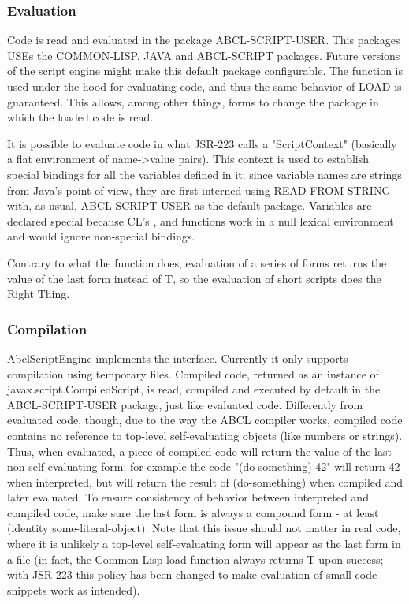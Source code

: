 \documentclass[10pt]{book}
\begin{document}
\subsubsection{Evaluation}

Code is read and evaluated in the package ABCL-SCRIPT-USER. This
packages USEs the COMMON-LISP, JAVA and ABCL-SCRIPT packages. Future
versions of the script engine might make this default package
configurable. The  function is used under the hood for
evaluating code, and thus the same behavior of LOAD is
guaranteed. This allows, among other things,  forms
to change the package in which the loaded code is read.

It is possible to evaluate code in what JSR-223 calls a
"ScriptContext" (basically a flat environment of name->value
pairs). This context is used to establish special bindings for all the
variables defined in it; since variable names are strings from Java's
point of view, they are first interned using READ-FROM-STRING with, as
usual, ABCL-SCRIPT-USER as the default package. Variables are declared
special because CL's ,  and 
functions work in a null lexical environment and would ignore
non-special bindings.

Contrary to what the function  does, evaluation of a series
of forms returns the value of the last form instead of T, so the
evaluation of short scripts does the Right Thing.

\subsubsection{Compilation}

AbclScriptEngine implements the 
interface. Currently it only supports compilation using temporary
files. Compiled code, returned as an instance of
javax.script.CompiledScript, is read, compiled and executed by default
in the ABCL-SCRIPT-USER package, just like evaluated code. Differently
from evaluated code, though, due to the way the ABCL compiler works,
compiled code contains no reference to top-level self-evaluating
objects (like numbers or strings). Thus, when evaluated, a piece of
compiled code will return the value of the last non-self-evaluating
form: for example the code "(do-something) 42" will return 42 when
interpreted, but will return the result of (do-something) when
compiled and later evaluated. To ensure consistency of behavior
between interpreted and compiled code, make sure the last form is
always a compound form - at least (identity some-literal-object). Note
that this issue should not matter in real code, where it is unlikely a
top-level self-evaluating form will appear as the last form in a file
(in fact, the Common Lisp load function always returns T upon success;
with JSR-223 this policy has been changed to make evaluation of small
code snippets work as intended).
\end{document}
